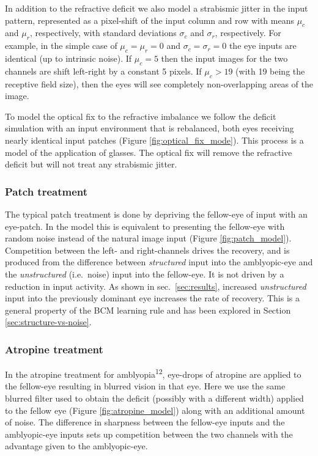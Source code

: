 \documentclass[
]{article}
\begin{document}
In addition to the refractive deficit we also model a strabismic jitter
in the input pattern, represented as a pixel-shift of the input column
and row with means \(\mu_c\) and \(\mu_r\), respectively, with standard
deviations \(\sigma_c\) and \(\sigma_r\), respectively. For example, in
the simple case of \(\mu_c=\mu_r=0\) and \(\sigma_c=\sigma_r=0\) the eye
inputs are identical (up to intrinsic noise). If \(\mu_c=5\) then the
input images for the two channels are shift left-right by a constant 5
pixels. If \(\mu_c>19\) (with 19 being the receptive field size), then
the eyes will see completely non-overlapping areas of the image.

To model the optical fix to the refractive imbalance we follow the
deficit simulation with an input environment that is rebalanced, both
eyes receiving nearly identical input patches (Figure
\ref{fig:optical_fix_mode}). This process is a model of the application
of glasses. The optical fix will remove the refractive deficit but will
not treat any strabismic jitter.

\subsubsection{Patch treatment}\label{sec:patch-treatment}

The typical patch treatment is done by depriving the fellow-eye of input
with an eye-patch. In the model this is equivalent to presenting the
fellow-eye with random noise instead of the natural image input (Figure
\ref{fig:patch_model}). Competition between the left- and right-channels
drives the recovery, and is produced from the difference between
\emph{structured} input into the amblyopic-eye and the
\emph{unstructured} (i.e.~noise) input into the fellow-eye. It is not
driven by a reduction in input activity. As shown in
sec.~\ref{sec:results}, increased \emph{unstructured} input into the
previously dominant eye increases the rate of recovery. This is a
general property of the BCM learning rule and has been explored in
Section \ref{sec:structure-vs-noise}.

\subsubsection{Atropine treatment}\label{sec:atropine-treatment}

In the atropine treatment for amblyopia\textsuperscript{12}, eye-drops
of atropine are applied to the fellow-eye resulting in blurred vision in
that eye. Here we use the same blurred filter used to obtain the deficit
(possibly with a different width) applied to the fellow eye (Figure
\ref{fig:atropine_model}) along with an additional amount of noise. The
difference in sharpness between the fellow-eye inputs and the
amblyopic-eye inputs sets up competition between the two channels with
the advantage given to the amblyopic-eye.
\end{document}
